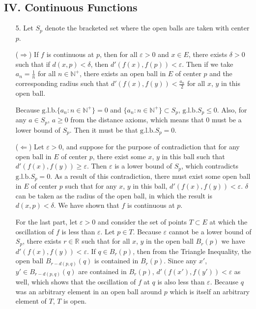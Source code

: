 \documentclass[a4paper,12pt]{article}
\begin{document}
    \subsection*{IV. Continuous Functions}
    \begin{enumerate}
        \item[5.]
            Let $S_p$ denote the bracketed set where the open balls are taken with center $p$. \par
            ($\Rightarrow$) If $f$ is continuous at $p$, then for all $\varepsilon > 0$ and $x \in E$, there exists $\delta > 0$ such that if $d(x, p) < \delta$, then $d'(f(x), f(p)) < \varepsilon$. Then if we take $a_n = \frac{1}{n}$ for all $n \in \mathbb{N}^+$, there exists an open ball in $E$ of center $p$ and the corresponding radius such that $d'(f(x), f(y)) < \frac{a_n}{2}$ for all $x$, $y$ in this open ball.
            \iffalse
            \begin{align*}
                d'(f(x), f(y)) \leq d'(f(x), f(p)) + d'(f(p), f(y)) < \frac{a_n}{2} + \frac{a_n}{2} = a_n.
            \end{align*}
            \fi
            Because $\text{g.l.b.}\{ a_n : n \in \mathbb{N}^+ \} = 0$ and $\{ a_n : n \in \mathbb{N}^+ \} \subset S_p$, $\text{g.l.b.} S_p \leq 0$. Also, for any $a \in S_p$, $a \geq 0$ from the distance axioms, which means that $0$ must be a lower bound of $S_p$. Then it must be that $\text{g.l.b.} S_p = 0$. \par
            ($\Leftarrow$) Let $\varepsilon > 0$, and suppose for the purpose of contradiction that for any open ball in $E$ of center $p$, there exist some $x$, $y$ in this ball such that $d'(f(x), f(y)) \geq \varepsilon$. Then $\varepsilon$ is a lower bound of $S_p$, which contradicts $\text{g.l.b.} S_p = 0$. As a result of this contradiction, there must exist some open ball in $E$ of center $p$ such that for any $x$, $y$ in this ball, $d'(f(x), f(y)) < \varepsilon$. $\delta$ can be taken as the radius of the open ball, in which the result is $d(x, p) < \delta$. We have shown that $f$ is continuous at $p$. \par
            For the last part, let $\varepsilon > 0$ and consider the set of points $T \subset E$ at which the oscillation of $f$ is less than $\varepsilon$. Let $p \in T$. Because $\varepsilon$ cannot be a lower bound of $S_p$, there exists $r \in \mathbb{R}$ such that for all $x$, $y$ in the open ball $B_r(p)$ we have $d'(f(x), f(y)) < \varepsilon$. If $q \in B_r(p)$, then from the Triangle Inequality, the open ball $B_{r - d(p, q)}(q)$ is contained in $B_r(p)$. Since any $x'$, $y' \in B_{r - d(p, q)}(q)$ are contained in $B_r(p)$, $d'(f(x'), f(y')) < \varepsilon$ as well, which shows that the oscillation of $f$ at $q$ is also less than $\varepsilon$. Because $q$ was an arbitrary element in an open ball around $p$ which is itself an arbitrary element of $T$, $T$ is open.


\end{enumerate}
\end{document}

